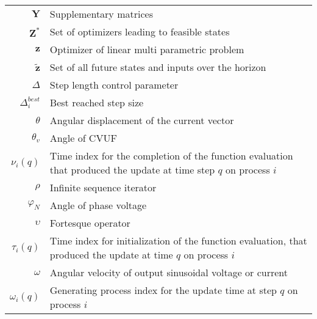 \begin{scriptsize}
\begin{tabularx}{\textwidth}{r|X}
 $\textbf{Y}$ & Supplementary matrices\\

$\textbf{Z}^*$              & Set of optimizers leading to feasible states\\
$\textbf{z}$											& Optimizer of linear multi parametric problem\\
$\tilde{\textbf{z}}$        & Set of all future states and inputs over the horizon\\

$\Delta$													& Step length control parameter\\
$\Delta_i^{best}$											& Best reached step size\\
$\theta$                    & Angular displacement of the current vector\\
$\theta_v$  											& Angle of CVUF\\
$\nu_i(q)$ 												& Time index for the completion of the function evaluation that produced the update at time step $q$ on process $i$\\
$\rho$																& Infinite sequence iterator\\
$\varphi_N$												& Angle of phase voltage\\
$\upsilon$  											& Fortesque operator\\
$\tau_i(q)$												& Time index for initialization of the function evaluation, that produced the update at time $q$ on process $i$\\
$\omega$													& Angular velocity of output sinusoidal voltage or current\\
$\omega_i(q)$ 										& Generating process index for the update time at step $q$ on process $i$\\

\end{tabularx}
\end{scriptsize}

